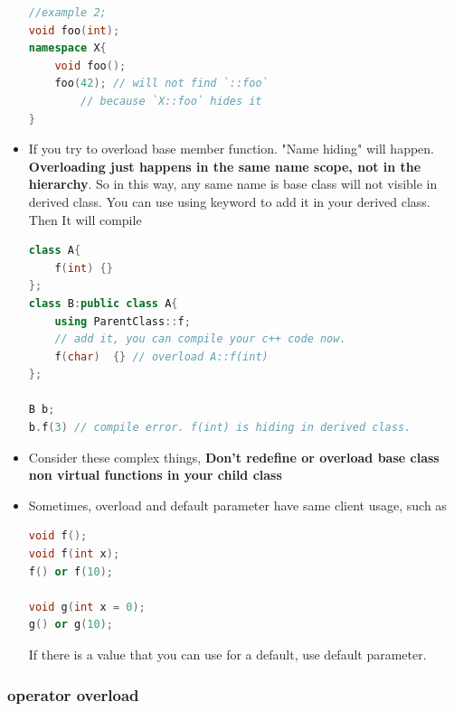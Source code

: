 \documentclass[a4paper,12pt,twoside]{book}
\begin{document}
\begin{itemize}
\begin{lstlisting}[frame=single, language=c++]
//example 2;
void foo(int);
namespace X{
    void foo();
    foo(42); // will not find `::foo`
        // because `X::foo` hides it
}
\end{lstlisting}

\item If you try to overload base member function.  "Name hiding" will happen.  \textbf{Overloading just happens in the same name scope, not in the hierarchy}. So in this way, any same name is base class will not  visible in derived class. You can use using keyword to add it in your derived class. Then It will compile
\begin{lstlisting}[frame=single, language=c++]
class A{
    f(int) {}
};
class B:public class A{
    using ParentClass::f;
    // add it, you can compile your c++ code now.
    f(char)  {} // overload A::f(int)
};

B b;
b.f(3) // compile error. f(int) is hiding in derived class.
\end{lstlisting}

\item Consider these complex things, \textbf{Don't redefine or overload base class non virtual functions in your child class}

\item Sometimes, overload and default parameter have same client usage, such as
\begin{lstlisting}[frame=single, language=c++]
void f();
void f(int x);
f() or f(10);

void g(int x = 0);
g() or g(10);
\end{lstlisting}
If there is a value that you can use for a default, use default parameter.

\end{itemize}

\subsubsection{operator overload}
\end{document}
